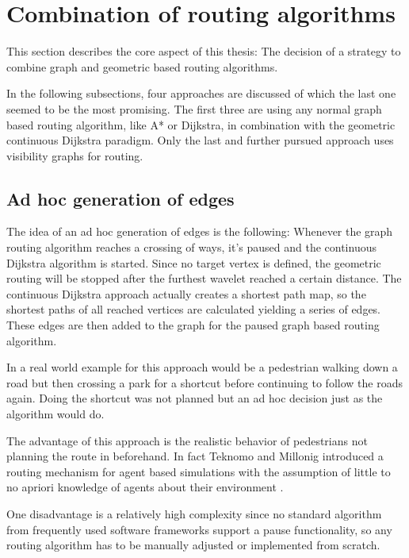 
\section{Combination of routing algorithms}
\label{sec:combining-routing-algorithms}

	This section describes the core aspect of this thesis:
	The decision of a strategy to combine graph and geometric based routing algorithms.
	
	In the following subsections, four approaches are discussed of which the last one seemed to be the most promising.
	The first three are using any normal graph based routing algorithm, like A* or Dijkstra, in combination with the geometric continuous Dijkstra paradigm.
	Only the last and further pursued approach uses visibility graphs for routing.
	
	\subsection{Ad hoc generation of edges}
	
		The idea of an ad hoc generation of edges is the following:
		Whenever the graph routing algorithm reaches a crossing of ways, it's paused and the continuous Dijkstra algorithm is started.
		Since no target vertex is defined, the geometric routing will be stopped after the furthest wavelet reached a certain distance.
		The continuous Dijkstra approach actually creates a shortest path map, so the shortest paths of all reached vertices are calculated yielding a series of edges.
		These edges are then added to the graph for the paused graph based routing algorithm.
		
		In a real world example for this approach would be a pedestrian walking down a road but then crossing a park for a shortcut before continuing to follow the roads again.
		Doing the shortcut was not planned but an ad hoc decision just as the algorithm would do.
		
		The advantage of this approach is the realistic behavior of pedestrians not planning the route in beforehand.
		In fact Teknomo and Millonig introduced a routing mechanism for agent based simulations with the assumption of little to no apriori knowledge of agents about their environment \cite{teknomo-millonig-routing}.
		
		One disadvantage is a relatively high complexity since no standard algorithm from frequently used software frameworks support a pause functionality, so any routing algorithm has to be manually adjusted or implemented from scratch.
		
